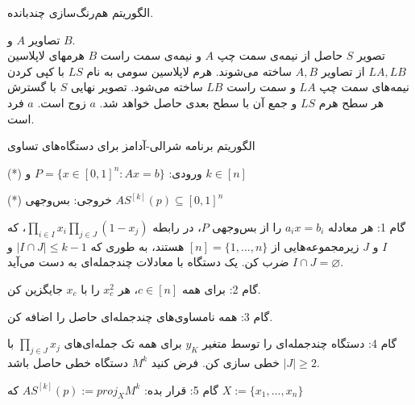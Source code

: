 \begin{algorithm}[!ht]
\caption{الگوریتم هم‌رنگ‌سازی چندبانده.} \label{alg:multibandblending2}
\begin{algorithmic}[1]
\REQUIRE تصاویر $A$ و $B$.\\
\ENSURE تصویر $S$ حاصل از  نیمه‌ی سمت چپ $A$ و نیمه‌ی سمت راست $B$
  \STATE هرمهای لاپلاسین $LA,LB$ از تصاویر $A,B$ ساخته می‌شوند.
  \STATE هرم لاپلاسین سومی به نام $LS$ با کپی کردن نیمه‌های سمت چپ $LA$ و سمت راست $LB$ ساخته می‌شود.
  \STATE تصویر نهایی $S$ با گسترش هر سطح هرم $LS$ و جمع آن با سطح بعدی حاصل خواهد شد.   
  \PRINT $a$ زوج است.
  \ELSE 
  \PRINT $a$ فرد است.  
\ENDIF
\end{algorithmic}
\end{algorithm}

\begin{algorithm}[!ht]
\caption{الگوریتم برنامه شرالی-آدامز برای دستگاه‌های تساوی}\label{sh-ad}
\begin{algorithmic}[1]
\item[(*)]
ورودی: $ P=\lbrace x \in [0,1]^{n} : Ax=b \rbrace $ و $ k \in [n] $  
\item[(*)]
خروجی: بس‌وجهی  $ A S^{[k]}(p) \subseteq [0,1]^{n} $
  \item[گام 1:]
  هر معادله $ a_{i}x=b_{i} $ را از بس‌وجهی $ P $، در رابطه $ \prod_{i \in I}x_{i} \prod_{j \in J}(1-x_{j}) $، که $ I $ و $ J $ زیرمجموعه‌هایی از $ [n]=\lbrace 1,...,n \rbrace $ هستند، به طوری ‌که $ \vert I \cap J \vert \leq k-1 $ و $  I \cap J = \varnothing $ ضرب کن. یک دستگاه با معادلات چندجمله‌ای به دست می‌آید.  
   \item[گام 2:]
برای همه $ c \in [n] $، هر $ x_{c}^{2}$ را با $ x_{c} $ جایگزین کن. 
    \item[گام 3:]
 همه نامساوی‌های چندجمله‌ای حاصل را اضافه کن.
     \item[گام 4:]
 دستگاه چندجمله‌ای را توسط متغیر $ y_{K} $ برای همه تک جمله‌ای‌های $ \prod_{j \in J}x_{j} $ با $ \vert J \vert \geq 2 $ خطی سازی کن. فرض کنید $ M^{k} $ دستگاه خطی حاصل باشد.
    \item[گام 5:]
قرار بده: $ A S^{[k]}(p):=proj _{X} M^{k} $ که $ X:= \lbrace x_{1},...,x_{n} \rbrace $ 
\end{algorithmic}
\end{algorithm}




